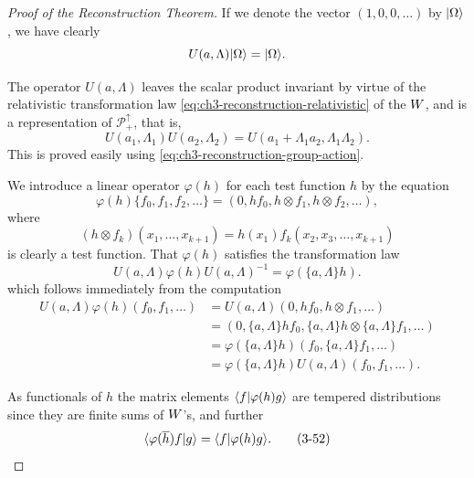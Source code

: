 \begin{proof}[Proof of the Reconstruction Theorem]
If we denote the vector \((1,0,0,\ldots)\) by \(\lvert \Omega\rangle\), we have
clearly
\begin{equation*}
U(a,\Lambda)\lvert \Omega\rangle=\lvert \Omega\rangle .
\end{equation*}

The operator \(U(a,\Lambda)\) leaves the scalar product invariant by virtue
of the relativistic transformation law \eqref{eq:ch3-reconstruction-relativistic} of the \(W\), and is
a representation of \(\mathcal{P}_+^\uparrow\), that is,
\begin{equation*}
U(a_1,\Lambda_1)U(a_2,\Lambda_2)
 =U(a_1+\Lambda_1a_2,\Lambda_1\Lambda_2) .
\end{equation*}
This is proved easily using \eqref{eq:ch3-reconstruction-group-action}.

We introduce a linear operator \(\varphi(h)\) for each test function \(h\) by
the equation
\begin{equation}
\varphi(h)\{f_0,f_1,f_2,\ldots\}
 =(0,hf_0,h\otimes f_1,h\otimes f_2,\ldots),
\tag{3-50}\label{eq:ch3-reconstruction-field-sequence}
\end{equation}
where
\begin{equation*}
(h\otimes f_k)(x_1,\ldots,x_{k+1})
 =h(x_1)f_k(x_2,x_3,\ldots,x_{k+1})
\end{equation*}
is clearly a test function.  That \(\varphi(h)\) satisfies the transformation
law
\begin{equation}
U(a,\Lambda)\varphi(h)U(a,\Lambda)^{-1}
 =\varphi(\{a,\Lambda\}h) .
\tag{3-51}\label{eq:ch3-reconstruction-field-covariance}
\end{equation}
which follows immediately from the computation
\begin{equation*}
\begin{aligned}
U(a,\Lambda)\varphi(h)(f_0,f_1,\ldots)
 &=U(a,\Lambda)(0,hf_0,h\otimes f_1,\ldots)\\
 &=(0,\{a,\Lambda\}h f_0,
       \{a,\Lambda\}h\otimes\{a,\Lambda\}f_1,\ldots)\\
 &=\varphi(\{a,\Lambda\}h)(f_0,\{a,\Lambda\}f_1,\ldots)\\
 &=\varphi(\{a,\Lambda\}h)U(a,\Lambda)(f_0,f_1,\ldots) .
\end{aligned}
\end{equation*}

As functionals of \(h\) the matrix elements
\(\langle f\vert \varphi(h)g\rangle\) are tempered distributions since they are finite
sums of \(W\)'s, and further
\begin{equation}
\langle \varphi(\overline h)f\vert g\rangle=\langle f\vert \varphi(h)g\rangle .
\tag{3-52}\label{eq:ch3-reconstruction-field-adjoint-form}
\end{equation}


\end{proof}
